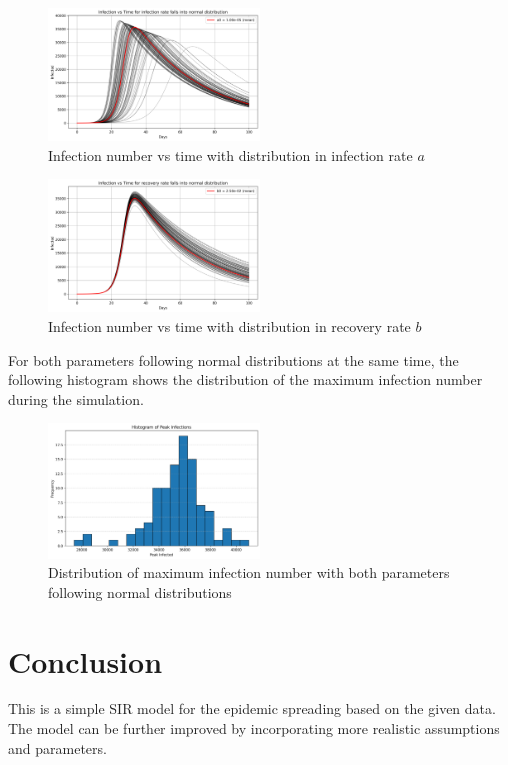 \documentclass[11pt]{article}
\begin{document}
\begin{figure}[H]
    \centering
    \includegraphics[width=0.5\textwidth]{infection_normal_distribution}
    \caption{Infection number vs time with distribution in infection rate $a$}
    \label{a_distribution}
\end{figure}

\begin{figure}[H]
    \centering
    \includegraphics[width=0.5\textwidth]{recovery_normal_distribution}
    \caption{Infection number vs time with distribution in recovery rate $b$}
    \label{b_distribution}
\end{figure}

For both parameters following normal distributions at the same time, the following histogram shows the distribution of the maximum infection number during the simulation.
\begin{figure}[H]
    \centering
    \includegraphics[width=0.5\textwidth]{histogram}
    \caption{Distribution of maximum infection number with both parameters following normal distributions}
    \label{histogram}
\end{figure}

\section{Conclusion}
This is a simple SIR model for the epidemic spreading based on the given data. The model can be further improved by incorporating more realistic assumptions and parameters.
\end{document}
